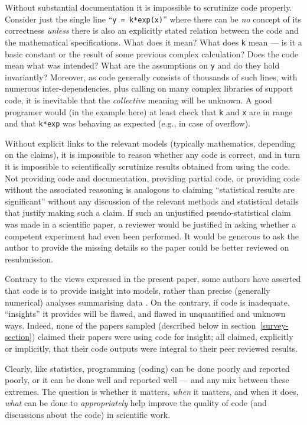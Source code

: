 \documentclass[10pt,letterpaper]{article}
\begin{document}
Without substantial documentation it is impossible to scrutinize code properly. Consider just the single line ``\texttt{y = k*exp(x)}'' where there can be \emph{no\/} concept of its correctness \emph{unless\/} there is also an explicitly stated relation between the code and the mathematical specifications. What does it mean? What does \texttt{k} mean --- is it a basic constant or the result of some previous complex calculation? Does the code mean what was intended? What are the assumptions on \texttt{y} and do they hold invariantly? Moreover, as code generally consists of thousands of such lines, with numerous inter-dependencies, plus calling on many complex libraries of support code, it is inevitable that the \emph{collective\/} meaning will be unknown. A good programer would (in the example here) at least check that \texttt{k} and \texttt{x} are in range and that \texttt{k*exp} was behaving as expected (e.g., in case of overflow).

Without explicit links to the relevant models (typically mathematics, depending on the claims), it is impossible to reason whether any code is correct, and in turn it is impossible to scientifically scrutinize results obtained from using the code. Not providing code and documentation, providing partial code, or providing code without the associated reasoning is analogous to claiming ``statistical results are significant'' without any discussion of the relevant methods and statistical details that justify making such a claim. If such an unjustified pseudo-statistical claim was made in a scientific paper, a reviewer would be justified in asking whether a competent experiment had even been performed. It would be generous to ask the author to provide the missing details so the paper could be better reviewed on resubmission. 

Contrary to the views expressed in the present paper, some authors have asserted that code is to provide insight into models, rather than precise (generally numerical) analyses summarising data \cite{assessing-quality}. On the contrary, if code is inadequate, ``insights'' it provides will be flawed, and flawed in unquantified and unknown ways. Indeed, none of the papers sampled (described below in section~\ref{survey-section}) claimed their papers were using code for insight; all claimed, explicitly or implicitly, that their code outputs were integral to their peer reviewed results.

Clearly, like statistics, programming (coding) can be done poorly and reported poorly, or it can be done well and reported well --- and any mix between these extremes. The question is whether it matters, \emph{when\/} it matters, and when it does, \emph{what\/} can be done to \emph{appropriately\/} help improve the quality of code (and discussions about the code) in scientific work.
\end{document}

